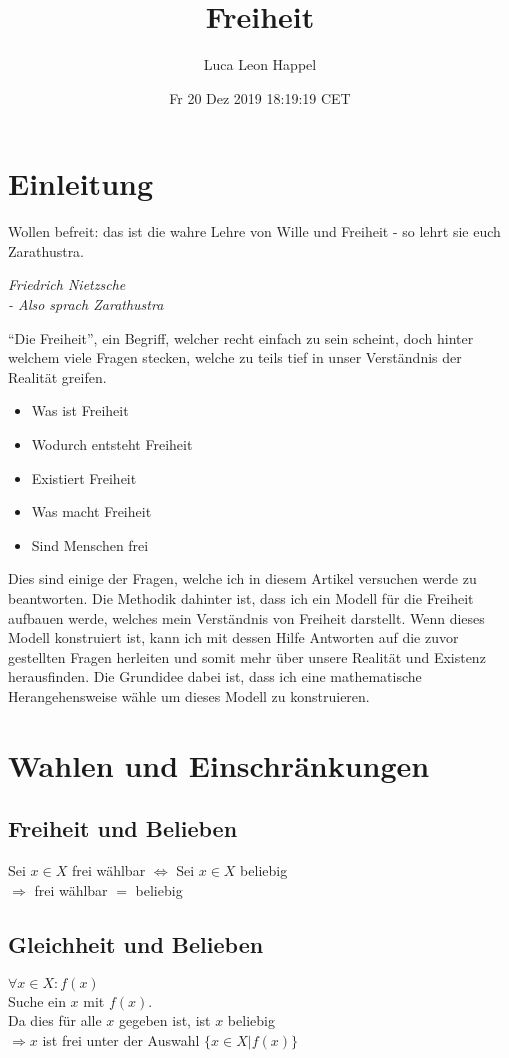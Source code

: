 \documentclass[12pt]{article}
\title{Freiheit}
\author{Luca Leon Happel}
\date{Fr 20 Dez 2019 18:19:19 CET}
\begin{document}
	\maketitle
	\tableofcontents
	\newpage

	\section{Einleitung}
		\epigraph{
			Wollen befreit: das ist die wahre Lehre von
			Wille und Freiheit - so lehrt sie euch Zarathustra.
		}{
			\textit{Friedrich Nietzsche\\- Also sprach Zarathustra}
		}
		``Die Freiheit'', ein Begriff, welcher recht einfach zu sein
		scheint, doch hinter welchem viele Fragen stecken, welche
		zu teils tief in unser Verständnis der Realität greifen.
		\begin{itemize}
			\item Was ist Freiheit
			\item Wodurch entsteht Freiheit
			\item Existiert Freiheit
			\item Was macht Freiheit
			\item Sind Menschen frei
		\end{itemize}
		Dies sind einige der Fragen, welche ich in diesem Artikel
		versuchen werde zu beantworten. Die Methodik dahinter ist, dass
		ich ein Modell für die Freiheit aufbauen werde, welches mein
		Verständnis von Freiheit darstellt. Wenn dieses Modell
		konstruiert ist, kann ich mit dessen Hilfe Antworten auf die
		zuvor gestellten Fragen herleiten und somit mehr über unsere
		Realität und Existenz herausfinden.
		Die Grundidee dabei ist, dass ich eine mathematische
		Herangehensweise wähle um dieses Modell zu konstruieren.

	\section{Wahlen und Einschränkungen}
		\subsection{Freiheit und Belieben}
			Sei $x\in X$ frei wählbar $\Leftrightarrow$
			Sei $x\in X$ beliebig\\
			$\Rightarrow$ frei wählbar $=$ beliebig
		\subsection{Gleichheit und Belieben}
			$\forall x \in X : f(x)$\\
			Suche ein $x$ mit $f(x)$.\\
			Da dies für alle $x$ gegeben ist, ist $x$ beliebig\\
			$\Rightarrow x$ ist frei unter der Auswahl $\{x\in X | f(x)\}$
\end{document}
